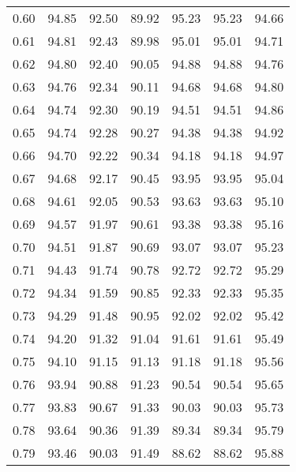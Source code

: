 \begin{tabular}{|c|c|c|c|c|c|c|}
      0.60 &     94.85 &     92.50 &      89.92 &   95.23 &      95.23 &         94.66 \\
      0.61 &     94.81 &     92.43 &      89.98 &   95.01 &      95.01 &         94.71 \\
      0.62 &     94.80 &     92.40 &      90.05 &   94.88 &      94.88 &         94.76 \\
      0.63 &     94.76 &     92.34 &      90.11 &   94.68 &      94.68 &         94.80 \\
      0.64 &     94.74 &     92.30 &      90.19 &   94.51 &      94.51 &         94.86 \\
      0.65 &     94.74 &     92.28 &      90.27 &   94.38 &      94.38 &         94.92 \\
      0.66 &     94.70 &     92.22 &      90.34 &   94.18 &      94.18 &         94.97 \\
      0.67 &     94.68 &     92.17 &      90.45 &   93.95 &      93.95 &         95.04 \\
      0.68 &     94.61 &     92.05 &      90.53 &   93.63 &      93.63 &         95.10 \\
      0.69 &     94.57 &     91.97 &      90.61 &   93.38 &      93.38 &         95.16 \\
      0.70 &     94.51 &     91.87 &      90.69 &   93.07 &      93.07 &         95.23 \\
      0.71 &     94.43 &     91.74 &      90.78 &   92.72 &      92.72 &         95.29 \\
      0.72 &     94.34 &     91.59 &      90.85 &   92.33 &      92.33 &         95.35 \\
      0.73 &     94.29 &     91.48 &      90.95 &   92.02 &      92.02 &         95.42 \\
      0.74 &     94.20 &     91.32 &      91.04 &   91.61 &      91.61 &         95.49 \\
      0.75 &     94.10 &     91.15 &      91.13 &   91.18 &      91.18 &         95.56 \\
      0.76 &     93.94 &     90.88 &      91.23 &   90.54 &      90.54 &         95.65 \\
      0.77 &     93.83 &     90.67 &      91.33 &   90.03 &      90.03 &         95.73 \\
      0.78 &     93.64 &     90.36 &      91.39 &   89.34 &      89.34 &         95.79 \\
      0.79 &     93.46 &     90.03 &      91.49 &   88.62 &      88.62 &         95.88 \\

\end{tabular}
